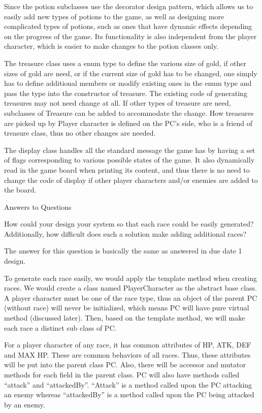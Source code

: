 \documentclass[11pt]{article}
\theoremstyle{plain} \newtheorem{theorem*}{Theorem}[subsection]
\begin{document}
Since the potion subclasses use the decorator design pattern, which allows us
to easily add new types of potions to the game, as well as designing more
complicated types of potions, such as ones that have dynamic effects depending
on the progress of the game. Its functionality is also independent from the
player character, which is easier to make changes to the potion classes only. 

The treasure class uses a enum type to define the various size of gold, if
other sizes of gold are need, or if the current size of gold has to be changed,
one simply has to define additional members or modify existing ones in the enum
type and pass the type into the constructor of treasure. The existing code of
generating treasures may not need change at all. If other types of treasure are
need, subclasses of Treasure can be added to accommodate the change. How
treasures are picked up by Player character is defined on the PC’s side, who is
a friend of treasure class, thus no other changes are needed. 

The display class handles all the standard message the game has by having a set
of flags corresponding to various possible states of the game. It also
dynamically read in the game board when printing its content, and thus there is
no need to change the code of display if other player characters and/or enemies
are added to the board.  


Answers to Questions 

How could your design your system so that each race could be easily generated?
Additionally, how difficult does such a solution make adding additional races? 

The answer for this question is basically the same as answered in due date 1
design. 

To generate each race easily, we would apply the template method when creating
races. We would create a class named PlayerCharacter as the abstract base
class. A player character must be one of the race type, thus an object of the
parent PC (without race) will never be initialized, which means PC will have
pure virtual method (discussed later). Then, based on the template method, we
will make each race a distinct sub class of PC.  

For a player character of any race, it has common attributes of HP, ATK, DEF
and MAX HP. These are common behaviors of all races. Thus, these attributes
will be put into the parent class PC. Also, there will be accessor and mutator
methods for each field in the parent class. PC will also have methods called
“attack” and “attackedBy”. “Attack” is a method called upon the PC attacking an
enemy whereas “attackedBy” is a method called upon the PC being attacked by an
enemy. 
\end{document}
